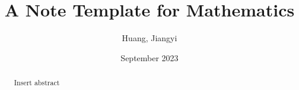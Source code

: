 \documentclass{article}
\title{A Note Template for Mathematics}
\author{Huang, Jiangyi}
\date{September 2023}
\begin{document}


\maketitle

\begin{abstract}
Insert abstract
\end{abstract}




\newpage


\end{document}
